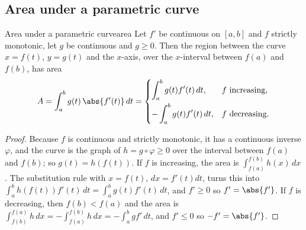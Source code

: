 \documentclass[11pt]{article}
\begin{document}
\subsection*{Area under a parametric curve}

\begin{thm}{Area under a parametric curve}{area}
Let $f'$ be continuous on $[a,b]$ and $f$ strictly monotonic, let $g$ be continuous and $g\ge0$. Then the region between the curve $x=f(t)$, $y=g(t)$ and the $x$-axis, over the $x$-interval between $f(a)$ and $f(b)$, has area
\[
A=\int_a^b g(t)\,\abs{f'(t)}\,dt=\begin{cases}\displaystyle\int_a^bg(t)f'(t)\,dt,& f\text{ increasing},\\[2ex]\displaystyle-\int_a^bg(t)f'(t)\,dt,& f\text{ decreasing}.\end{cases}
\]
\end{thm}
\begin{proof}
Because $f$ is continuous and strictly monotonic, it has a continuous inverse $\varphi$, and the curve is the graph of $h=g\circ\varphi\ge0$ over the interval between $f(a)$ and $f(b)$; so $g(t)=h(f(t))$. If $f$ is increasing, the area is $\int_{f(a)}^{f(b)}h(x)\,dx$. The substitution rule with $x=f(t)$, $dx=f'(t)dt$, turns this into $\int_a^bh(f(t))f'(t)\,dt=\int_a^bg(t)f'(t)\,dt$, and $f'\ge0$ so $f'=\abs{f'}$. If $f$ is decreasing, then $f(b)<f(a)$ and the area is $\int_{f(b)}^{f(a)}h\,dx=-\int_{f(a)}^{f(b)}h\,dx=-\int_a^bg f'\,dt$, and $f'\le0$ so $-f'=\abs{f'}$.
\end{proof}
\end{document}
